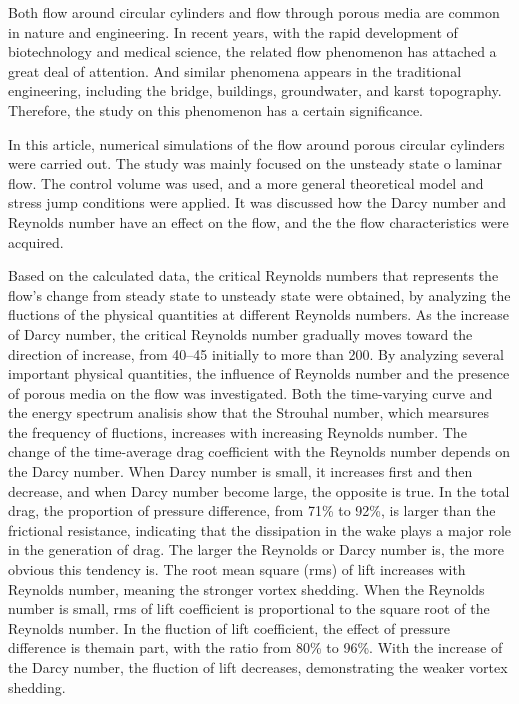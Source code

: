 \begin{eabstract}
Both flow around circular cylinders and flow through porous media are common in nature and engineering. In recent years, with the rapid development of biotechnology and medical science, the related flow phenomenon has attached a great deal of attention. And similar phenomena appears in the traditional engineering, including the bridge, buildings, groundwater, and karst topography. Therefore, the study on this phenomenon has a certain significance.

In this article, numerical simulations of the flow around porous circular cylinders were carried out. The study was mainly focused on the unsteady state o laminar flow. The control volume was used, and a more general theoretical model and stress jump conditions were applied. It was discussed how the Darcy number and Reynolds number have an effect on the flow, and the the flow characteristics were acquired.

Based on the calculated data, the critical Reynolds numbers that represents the flow's change from steady state to unsteady state were obtained, by analyzing the fluctions of the physical quantities at different Reynolds numbers. As the increase of Darcy number, the critical Reynolds number gradually moves toward the direction of increase, from 40--45 initially to more than 200. By analyzing several important physical quantities, the influence of Reynolds number and the presence of porous media on the flow was investigated. Both the time-varying curve and the energy spectrum analisis show that the Strouhal number, which mearsures the frequency of fluctions, increases with increasing Reynolds number. The change of the time-average drag coefficient with the Reynolds number depends on the Darcy number. When Darcy number is small, it increases first and then decrease, and when Darcy number become large, the opposite is true. In the total drag, the proportion of pressure difference, from 71\% to 92\%, is larger than the frictional resistance, indicating that the dissipation in the wake plays a major role in the generation of drag. The larger the Reynolds or Darcy number is, the more obvious this tendency is. The root mean square (rms) of lift increases with Reynolds number, meaning the stronger vortex shedding. When the Reynolds number is small, rms of lift coefficient is proportional to the square root of the Reynolds number. In the fluction of lift coefficient, the effect of pressure difference is themain part, with the ratio from 80\% to 96\%. With the increase of the Darcy number, the fluction of lift decreases, demonstrating the weaker vortex shedding.
\end{eabstract}
